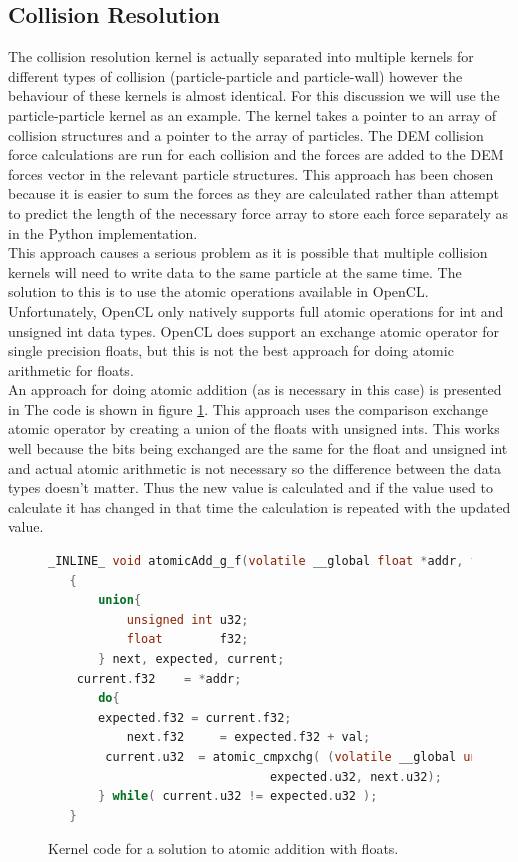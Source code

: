 \documentclass[10pt,a4paper,titlepage]{report}
\begin{document}
\subsection{Collision Resolution}
\label{sec:Collision Resolution}
The collision resolution kernel is actually separated into multiple kernels for different types of collision (particle-particle and particle-wall) however the behaviour of these kernels is almost identical. For this discussion we will use the particle-particle kernel as an example. The kernel takes a pointer to an array of collision structures and a pointer to the array of particles. The DEM collision force calculations are run for each collision and the forces are added to the DEM forces vector in the relevant particle structures. This approach has been chosen because it is easier to sum the forces as they are calculated rather than attempt to predict the length of the necessary force array to store each force separately as in the Python implementation.
\\This approach causes a serious problem as it is possible that multiple collision kernels will need to write data to the same particle at the same time. The solution to this is to use the atomic operations available in OpenCL. Unfortunately, OpenCL only natively supports full atomic operations for int and unsigned int data types. OpenCL does support an exchange atomic operator for single precision floats, but this is not the best approach for doing atomic arithmetic for floats.
\\An approach for doing atomic addition (as is necessary in this case) is presented in %
The code is shown in figure \ref{fig:atomic_float_addition}. This approach uses the comparison exchange atomic operator by creating a union of the floats with unsigned ints. This works well because the bits being exchanged are the same for the float and unsigned int and actual atomic arithmetic is not necessary so the difference between the data types doesn't matter. Thus the new value is calculated and if the value used to calculate it has changed in that time the calculation is repeated with the updated value.
\begin{figure}[!ht]
\begin{lstlisting}[language=C]
 _INLINE_ void atomicAdd_g_f(volatile __global float *addr, float val)
   {
       union{
           unsigned int u32;
           float        f32;
       } next, expected, current;
   	current.f32    = *addr;
       do{
   	   expected.f32 = current.f32;
           next.f32     = expected.f32 + val;
   		current.u32  = atomic_cmpxchg( (volatile __global unsigned int *)addr, 
                               expected.u32, next.u32);
       } while( current.u32 != expected.u32 );
   }
\end{lstlisting}
\caption{Kernel code for a solution to atomic addition with floats.}
\label{fig:atomic_float_addition}
\end{figure}
\end{document}
